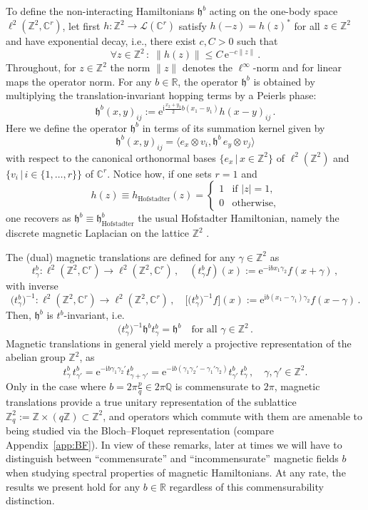 \documentclass[a4paper]{article}
\newcommand{\e}{\mathrm{e}}
\renewcommand{\i}{\mathrm{i}}
\newcommand{\fd}{r}
\newcommand{\Z}{\mathbb{Z}}
\newcommand{\C}{\mathbb{C}}
\newcommand{\R}{\mathbb{R}}
\newcommand{\mL}{\mathcal{L}}
\theoremstyle{plain}
\theoremstyle{definition}
\theoremstyle{remark}
\renewcommand{\(}{\left(}
\renewcommand{\)}{\right)}
\begin{document}
To define the non-interacting   Hamiltonians $\mathfrak{h}^b$ acting on the one-body space $ \ell^2(\Z^2,\C^\fd)$, let first 
  $h:\Z^2\to \mL(\C^\fd)$ satisfy  $h(-z) =   h(z)^*$ for all $z\in\Z^2$ and have exponential decay, i.e., there exist  $c,C>0$ such that
\[
\forall  z\in\Z^2\,:\; \|h(z)\|\leq C\,\e^{-c\|z\|}\,.
\]
Throughout, for $z\in\Z^2$ the norm $\|z\|$ denotes the $\ell^\infty$-norm and for linear maps the operator norm.
For any $b\in\R$, the   operator $\mathfrak{h}^b$ is obtained by multiplying the translation-invariant hopping terms by a Peierls phase:
 \[
\mathfrak{h}^b(x,y)_{ij} := \mathrm{e}^{ \mathrm{i}\frac{x_2+y_2}{2} b (x_1-y_1)} h(x-y)_{ij}\,.
 \]
Here we define the operator $\mathfrak{h}^b$ in terms of its summation kernel given by 
\begin{equation}\label{kernelDef}
\mathfrak{h}^b(x,y)_{ij}  = \langle e_x\otimes v_i, \mathfrak{h}^b\,e_y\otimes v_j\rangle
\end{equation}
with respect to the canonical orthonormal bases $\{e_x \,| \,x\in\Z^2\}$ of $\ell^2(\Z^2)$ and $\{v_i\, |\, i\in \{1,\ldots,\fd\}\}$ of $\C^\fd$. Notice how, if one sets $\fd=1$ and 
\[ h(z) \equiv h_{\mathrm{Hofstadter}}(z) = \begin{cases} 
1 & \text{if } |z| = 1, \\
0 & \text{otherwise}, 
\end{cases} \]
one recovers as $\mathfrak{h}^b \equiv \mathfrak{h}_{\mathrm{Hofstadter}}^b$ the usual Hofstadter Hamiltonian, namely the discrete magnetic Laplacian on the lattice $\Z^2$ \cite{hofstadter1976energy}.
 
The (dual) magnetic translations are defined for any $\gamma\in\Z^2$ as
\[
t^b_\gamma:\ell^2(\Z^2,\C^\fd)\to \ell^2(\Z^2,\C^\fd)\,,\quad (t^b_\gamma f)(x) := \e^{-\i b x_1\gamma_2}f(x+\gamma)\,,
\]
with inverse
\[
\big(t^b_\gamma\big)^{-1}:\ell^2(\Z^2,\C^\fd)\to \ell^2(\Z^2,\C^\fd)\,,\quad  \big[\big(t^b_\gamma\big)^{-1} f\big](x) := \e^{\i b (x_1-\gamma_1)\gamma_2}f(x-\gamma)\,.
\]
Then, $\mathfrak{h}^b$ is $t^b$-invariant, i.e.
\begin{equation} \label{eqn:hb_tb_inv}
\big(t_\gamma^b\big)^{-1}\mathfrak{h}^b  t_\gamma^b = \mathfrak{h}^b \quad \text{for all } \gamma\in\Z^2\,.
\end{equation}
Magnetic translations in general yield merely a projective representation of the abelian group $\Z^2$, as
\[ t_\gamma^b \, t_{\gamma'}^b = \e^{-\i b \gamma_1 \gamma_2'} t_{\gamma+\gamma'}^b = \e^{-\i b(\gamma_1 \gamma_2'-\gamma_1'\gamma_2)}  t_{\gamma'}^b \, t_{\gamma}^b\,, \quad \gamma, \gamma' \in \Z^2.  \]
Only in the case where $b = 2\pi \tfrac{p}{q} \in 2 \pi \mathbb{Q}$ is commensurate to $2\pi$, magnetic translations provide a true unitary representation of the sublattice $\Z^2_q := \Z \times (q\Z) \subset \Z^2$, and operators which commute with them are amenable to being studied via the Bloch--Floquet representation (compare Appendix~\ref{app:BF}). In view of these remarks, later at times we will have to distinguish between ``commensurate'' and ``incommensurate'' magnetic fields $b$ when studying spectral properties of magnetic Hamiltonians. At any rate, the results we present   hold for any $b \in \R$ regardless of this commensurability distinction.
\end{document}
